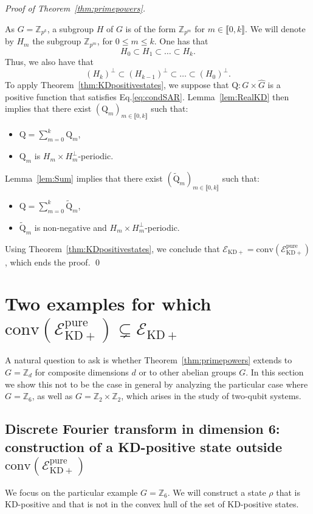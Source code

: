 \documentclass[a4paper, notitlepage, 11pt]{article}
\numberwithin{equation}{section}
\newcommand{\mcl}[1]{\ensuremath{\mathcal{#1}}}
\newcommand{\EcalKDC}{{\mcl E}_{\mathrm{KD+}}}
\newcommand{\EcalKDCpu}{{\mcl E}_{\mathrm{KD+}}^{\mathrm{pure}}}
\newcommand{\Z}{\mathbb{Z}}
\newcommand{\conv}[1]{\mathrm{conv}\left(#1\right)}
\newcommand{\IntEnt}[2]{\llbracket #1 , #2 \rrbracket}
\begin{document}
\noindent\textit{Proof of Theorem~\ref{thm:primepowers}.}

As $G=\Z_{p^{k}}$, a subgroup $H$ of $G$ is of the form $\Z_{p^{m}}$ for $m\in \IntEnt{0}{k}$. We will denote by $H_{m}$ the subgroup $\Z_{p^{m}}$, for $0\leq m\leq k$.
One has that
\begin{equation}
    H_0 \subset H_1 \subset \dots \subset H_k.
\end{equation} Thus, we also have that
\begin{equation}
    (H_k)^{\perp} \subset (H_{k-1})^{\perp} \subset \dots \subset (H_0)^{\perp}.
\end{equation}
To apply Theorem~\ref{thm:KDpositivestates}, we suppose that $\mathrm{Q}: G\times \hat{G}$ is a positive function that satisfies Eq.\eqref{eq:condSAR}. Lemma~\ref{lem:RealKD} then implies that there exist $(\mathrm{Q}_{m})_{m\in\IntEnt{0}{k}}$ such that:
\begin{itemize}
    \item $\mathrm{Q} = \sum_{m=0}^{k} \mathrm{Q}_{m}$,
    \item $\mathrm{Q}_m$ is $H_{m}\times H_{m}^{\perp}$-periodic.
\end{itemize}
Lemma~\ref{lem:Sum} implies that there exist $(\tilde{\mathrm{Q}}_{m})_{m\in\IntEnt{0}{k}}$ such that:
    \begin{itemize}
    \item $\mathrm{Q} = \sum_{m=0}^{k} \tilde{\mathrm{Q}}_{m}$,
    \item $\tilde{\mathrm{Q}}_m$ is non-negative and $H_{m}\times H_{m}^{\perp}$-periodic.
\end{itemize}
Using Theorem~\ref{thm:KDpositivestates}, we conclude that $\EcalKDC = \conv{\EcalKDCpu}$, which ends the proof. \qed

\section{Two examples for which $\conv{\EcalKDCpu} \subsetneq \EcalKDC$}\label{sec:ExamplesFT}

A natural question to ask is whether Theorem~\ref{thm:primepowers} extends to $G=\Z_d$ for composite dimensions $d$ or to other abelian groups $G$. In this section we show this not to be the case in general by analyzing the particular case where $G=\Z_6$, as well as $G=\Z_2\times\Z_2$, which arises in the study of two-qubit systems.

\subsection{Discrete Fourier transform in dimension 6: construction of a KD-positive state outside $\conv{\EcalKDCpu}$}
We focus on the particular example $G=\Z_{6}$. We will construct a state $\rho$ that is KD-positive and that is not in the convex hull of the set of KD-positive states.
\end{document}
